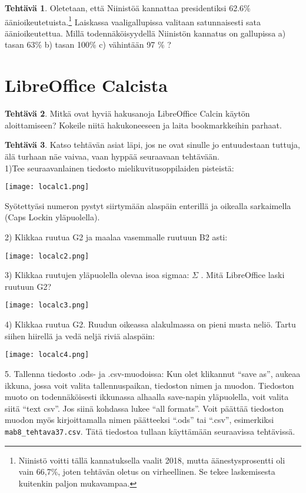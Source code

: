 \documentclass[12pt,leqno,a4paper,oneside]{amsart}
\theoremstyle{definition}
\newtheorem{exercise}{Tehtävä}
\theoremstyle{remark}
\numberwithin{equation}{section}
\begin{document}
\begin{exercise}
 Oletetaan, että Niinistöä kannattaa presidentiksi 62.6\% äänioikeutetuista.\footnote{Niinistö voitti tällä kannatuksella vaalit 2018, mutta
 äänestysprosentti oli vain 66,7\%, joten tehtävän oletus on virheellinen. Se tekee laskemisesta kuitenkin paljon mukavampaa.}
 Laiskassa vaaligallupissa valitaan satunnaisesti sata äänioikeutettua.
 Millä todennäköisyydellä Niinistön kannatus on gallupissa a) tasan 63\% b) tasan 100\% c) vähintään 97 \% ? 
\end{exercise}



\section{LibreOffice Calcista}

\begin{exercise}
 Mitkä ovat hyviä hakusanoja LibreOffice Calcin käytön aloittamiseen? Kokeile niitä hakukoneeseen ja laita bookmarkkeihin parhaat.
\end{exercise}

\begin{exercise}
\label{loex1}
 Katso tehtävän asiat läpi, jos ne ovat sinulle jo entuudestaan tuttuja, älä turhaan näe vaivaa, vaan hyppää seuraavaan tehtävään.\\
 1)Tee seuraavanlainen tiedosto mielikuvitusoppilaiden pisteistä:
 
 \texttt{[image: localc1.png]}
 
 Syötettyäsi numeron pystyt siirtymään alaspäin enterillä ja oikealla sarkaimella (Caps Lockin yläpuolella). 
 
 2) Klikkaa ruutua G2 ja maalaa vasemmalle ruutuun B2 asti:
 
 \texttt{[image: localc2.png]}
 
 3) Klikkaa ruutujen yläpuolella olevaa isoa sigmaa: $\Sigma$ . Mitä LibreOffice laski ruutuun G2?
 
 \texttt{[image: localc3.png]}
 
 4) Klikkaa ruutua G2. Ruudun oikeassa alakulmassa on pieni musta neliö. Tartu siihen hiirellä ja vedä neljä riviä alaspäin:
 
 \texttt{[image: localc4.png]}
 
 5. Tallenna tiedosto .ods- ja .csv-muodoissa: Kun olet klikannut ``save as'', aukeaa ikkuna, jossa voit valita tallennuspaikan, tiedoston nimen ja muodon.
 Tiedoston muoto on todennäköisesti ikkunassa alhaalla save-napin yläpuolella, voit valita siitä ``text csv''. Jos siinä kohdassa lukee ``all formats''.
 Voit päättää tiedoston muodon myös kirjoittamalla nimen päätteeksi ``.ods'' tai ``.csv'', esimerkiksi \texttt{mab8\_tehtava37.csv}.  
 Tätä tiedostoa tullaan käyttämään seuraavissa tehtävissä.
\end{exercise}
\end{document}
